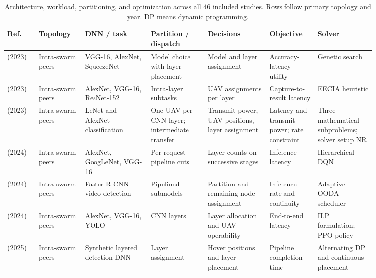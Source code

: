\begin{table}[!tp]
\caption{Architecture, workload, partitioning, and optimization across all 46 included studies. Rows follow primary topology and year. DP means dynamic programming.}\label{tab:architecture}
\centering
\fontsize{8}{10}\selectfont\setlength{\tabcolsep}{2.5pt}\renewcommand{\arraystretch}{1.08}
\begin{tabular}{@{}Y{0.0705\linewidth}Y{0.1043\linewidth}Y{0.1589\linewidth}Y{0.1363\linewidth}Y{0.1419\linewidth}Y{0.1175\linewidth}Y{0.1307\linewidth}@{}}
\toprule
Ref. & Topology & DNN / task & Partition / dispatch & Decisions & Objective & Solver \\
\midrule
\cite{R0003}\newline\mbox{(2023)} & Intra-swarm peers & VGG-16, AlexNet, SqueezeNet & Model choice with layer placement & Model and layer assignment & Accuracy-latency utility & Genetic search \\
\cite{R0015}\newline\mbox{(2023)} & Intra-swarm peers & AlexNet, VGG-16, ResNet-152 & Intra-layer subtasks & UAV assignments per layer & Capture-to-result latency & EECIA heuristic \\
\cite{R0082}\newline\mbox{(2023)} & Intra-swarm peers & LeNet and AlexNet classification & One UAV per CNN layer; intermediate transfer & Transmit power, UAV positions, layer assignment & Latency and transmit power; rate constraint & Three mathematical subproblems; solver setup NR \\
\cite{R0010}\newline\mbox{(2024)} & Intra-swarm peers & AlexNet, GoogLeNet, VGG-16 & Per-request pipeline cuts & Layer counts on successive stages & Inference latency & Hierarchical DQN \\
\cite{R0062}\newline\mbox{(2024)} & Intra-swarm peers & Faster R-CNN video detection & Pipelined submodels & Partition and remaining-node assignment & Inference rate and continuity & Adaptive OODA scheduler \\
\cite{R0073}\newline\mbox{(2024)} & Intra-swarm peers & AlexNet, VGG-16, YOLO & CNN layers & Layer allocation and UAV operability & End-to-end latency & ILP formulation; PPO policy \\
\cite{R0006}\newline\mbox{(2025)} & Intra-swarm peers & Synthetic layered detection DNN & Layer assignment & Hover positions and layer placement & Pipeline completion time & Alternating DP and continuous placement \\

\end{tabular}
\end{table}
